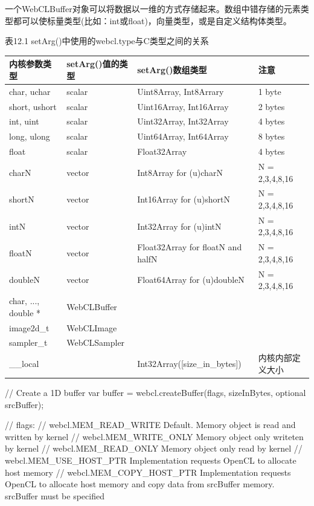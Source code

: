 一个WebCLBuffer对象可以将数据以一维的方式存储起来。数组中错存储的元素类型都可以使标量类型(比如：int或float)，向量类型，或是自定义结构体类型。

表12.1 setArg()中使用的webcl.type与C类型之间的关系

\par\medskip\noindent
\begingroup\fontsize{9bp}{12.5bp}\selectfont\renewcommand{\arraystretch}{1.12}
\begin{center}
\begin{tabularx}{\textwidth}{llXl}
\toprule
内核参数类型 & setArg()值的类型 & setArg()数组类型 & 注意 \\
\midrule
char, uchar & scalar & Uint8Array, Int8Arrary & 1 byte \\
short, ushort & scalar & Uint16Array, Int16Array & 2 bytes \\
int, uint & scalar & Uint32Array, Int32Array & 4 bytes \\
long, ulong & scalar & Uint64Array, Int64Array & 8 bytes \\
float & scalar & Float32Array & 4 bytes \\
charN & vector & Int8Array for (u)charN & N = 2,3,4,8,16 \\
shortN & vector & Int16Array for (u)shortN & N = 2,3,4,8,16 \\
intN & vector & Int32Array for (u)intN & N = 2,3,4,8,16 \\
floatN & vector & Float32Array for floatN and halfN & N = 2,3,4,8,16 \\
doubleN & vector & Float64Array for (u)doubleN & N = 2,3,4,8,16 \\
char, ..., double * & WebCLBuffer &  &  \\
image2d\_t & WebCLImage &  &  \\
sampler\_t & WebCLSampler &  &  \\
\_\_local &  & Int32Array([size\_in\_bytes]) & 内核内部定义大小 \\
\bottomrule
\end{tabularx}
\end{center}
\endgroup
\medskip

\begin{codebox}[javascript]
// Create a 1D buffer
var buffer = webcl.createBuffer(flags, sizeInBytes, optional srcBuffer);

// flags:
// webcl.MEM_READ_WRITE Default. Memory object is read and written by kernel
// webcl.MEM_WRITE_ONLY Memory object only writeten by kernel
// webcl.MEM_READ_ONLY Memory object only read by kernel
// webcl.MEM_USE_HOST_PTR Implementation requests OpenCL to allocate host memory
// webcl.MEM_COPY_HOST_PTR Implementation requests OpenCL to allocate host memory and copy data from srcBuffer memory. srcBuffer must be specified
\end{codebox}

